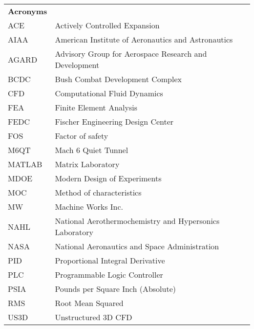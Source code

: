 \begin{spacing}{1.0}
    \begin{longtable}[htbp]{@{}p{} p{}@{}}
       
        \textbf{Acronyms}\\ [2ex] 
		ACE	& Actively Controlled Expansion\\ [2ex] %
        AIAA & American Institute of Aeronautics and Astronautics \\ [2ex]
        AGARD & Advisory Group for Aerospace Research and Development \\ [2ex]
		BCDC & Bush Combat Development Complex\\ [2ex]
		CFD	& Computational Fluid Dynamics\\ [2ex] 
		FEA & Finite Element Analysis\\	[2ex]
		FEDC & Fischer Engineering Design Center\\ [2ex]
        FOS & Factor of safety\\ [2ex]
        M6QT & Mach 6 Quiet Tunnel\\ [2ex]
        MATLAB & Matrix Laboratory\\ [2ex] 
        MDOE & Modern Design of Experiments\\ [2ex]
        MOC & Method of characteristics\\ [2ex]
		MW & Machine Works Inc.\\ [2ex]
		NAHL & National Aerothermochemistry and Hypersonics Laboratory\\ [2ex]
        NASA & National Aeronautics and Space Administration \\ [2ex]
        PID & Proportional Integral Derivative\\ [2ex]
        PLC & Programmable Logic Controller\\ [2ex]
        PSIA & Pounds per Square Inch (Absolute) \\ [2ex]
        RMS & Root Mean Squared \\ [2ex]
        US3D & Unstructured 3D CFD \\ [2ex]


\end{longtable}
\end{spacing}
